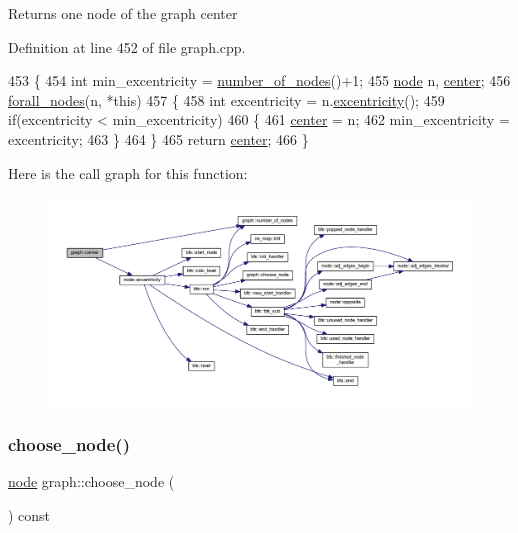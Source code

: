 \begin{DoxyReturn}{Returns}
one node of the graph center 
\end{DoxyReturn}


Definition at line 452 of file graph.\+cpp.


\begin{DoxyCode}
453 \{
454     \textcolor{keywordtype}{int} min\_excentricity = \mbox{\hyperlink{classgraph_a42c78e0a9f115655e3ff0efe35ebfc4e}{number\_of\_nodes}}()+1;
455     \mbox{\hyperlink{classnode}{node}} n, \mbox{\hyperlink{classgraph_a351617e023b4b6833ab650a70fc086e7}{center}};
456     \mbox{\hyperlink{graph_8h_a1905bf4c6aa7167b9ee5a2e72f12ad2d}{forall\_nodes}}(n, *\textcolor{keyword}{this}) 
457     \{
458     \textcolor{keywordtype}{int} excentricity = n.\mbox{\hyperlink{classnode_aba6b3a48e7b951f08ebbbf3275f0ce9a}{excentricity}}();
459     \textcolor{keywordflow}{if}(excentricity < min\_excentricity) 
460     \{
461         \mbox{\hyperlink{classgraph_a351617e023b4b6833ab650a70fc086e7}{center}} = n;
462         min\_excentricity = excentricity;
463     \}
464     \}
465     \textcolor{keywordflow}{return} \mbox{\hyperlink{classgraph_a351617e023b4b6833ab650a70fc086e7}{center}};
466 \}
\end{DoxyCode}
Here is the call graph for this function\+:
\nopagebreak
\begin{figure}[H]
\begin{center}
\leavevmode
\includegraphics[width=350pt]{classgraph_a351617e023b4b6833ab650a70fc086e7_cgraph}
\end{center}
\end{figure}
\mbox{\label{classgraph_aec5c11c90a94ebd145f059a541db860e}} 
\subsubsection{\texorpdfstring{choose\+\_\+node()}{choose\_node()}}
{\footnotesize\ttfamily \mbox{\hyperlink{classnode}{node}} graph\+::choose\+\_\+node (\begin{DoxyParamCaption}{ }\end{DoxyParamCaption}) const}

